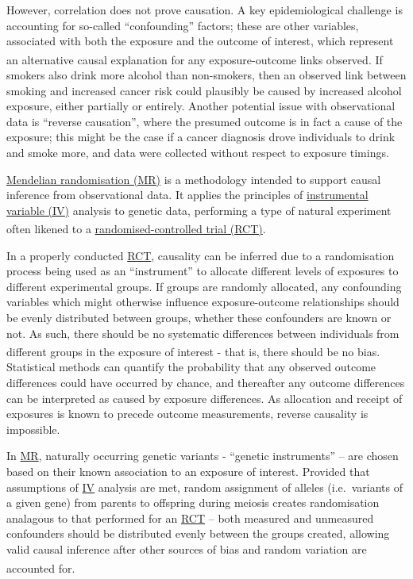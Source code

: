 \documentclass[
]{article}
\begin{document}
However, correlation does not prove causation. A key epidemiological challenge is accounting for so-called ``confounding'' factors; these are other variables, associated with both the exposure and the outcome of interest, which represent an alternative causal explanation for any exposure-outcome links observed\textsuperscript{}. If smokers also drink more alcohol than non-smokers, then an observed link between smoking and increased cancer risk could plausibly be caused by increased alcohol exposure, either partially or entirely. Another potential issue with observational data is ``reverse causation'', where the presumed outcome is in fact a cause of the exposure; this might be the case if a cancer diagnosis drove individuals to drink and smoke more, and data were collected without respect to exposure timings.

\hyperref[acronyms_MR]{Mendelian randomisation (MR)} is a methodology intended to support causal inference from observational data. It applies the principles of \hyperref[acronyms_IV]{instrumental variable (IV)} analysis to genetic data, performing a type of natural experiment often likened to a \hyperref[acronyms_RCT]{randomised-controlled trial (RCT)}\textsuperscript{}.

In a properly conducted \hyperref[acronyms_RCT]{RCT}, causality can be inferred due to a randomisation process being used as an ``instrument'' to allocate different levels of exposures to different experimental groups. If groups are randomly allocated, any confounding variables which might otherwise influence exposure-outcome relationships should be evenly distributed between groups, whether these confounders are known or not. As such, there should be no systematic differences between individuals from different groups in the exposure of interest - that is, there should be no bias\textsuperscript{}. Statistical methods can quantify the probability that any observed outcome differences could have occurred by chance, and thereafter any outcome differences can be interpreted as caused by exposure differences. As allocation and receipt of exposures is known to precede outcome measurements, reverse causality is impossible.

In \hyperref[acronyms_MR]{MR}, naturally occurring genetic variants - ``genetic instruments'' -- are chosen based on their known association to an exposure of interest. Provided that assumptions of \hyperref[acronyms_IV]{IV} analysis are met, random assignment of alleles (i.e.~variants of a given gene) from parents to offspring during meiosis creates randomisation analagous to that performed for an \hyperref[acronyms_RCT]{RCT} -- both measured and unmeasured confounders should be distributed evenly between the groups created, allowing valid causal inference after other sources of bias and random variation are accounted for\textsuperscript{}.
\end{document}
